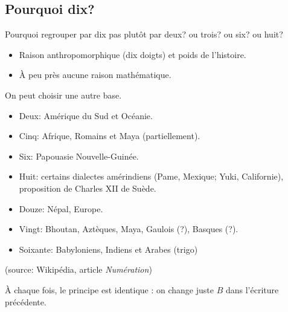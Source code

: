 \subsection{Pourquoi dix?}

Pourquoi regrouper par dix pas plutôt par deux? ou trois? ou six? ou
huit?

\begin{itemize}
\item Raison anthropomorphique (dix doigts) et poids de l'histoire.
\item À peu près aucune raison mathématique.
\end{itemize}

On peut choisir une autre base.

\begin{itemize}
\item Deux: Amérique du Sud et Océanie.
\item Cinq: Afrique, Romains et Maya (partiellement).
\item Six: Papouasie Nouvelle-Guinée.
\item Huit: certains dialectes amérindiens (Pame, Mexique; Yuki,
  Californie), proposition de Charles XII de Suède.
\item Douze: Népal, Europe.
\item Vingt: Bhoutan, Aztèques, Maya, Gaulois (?), Basques (?).
\item Soixante: Babyloniens, Indiens et Arabes (trigo)
\end{itemize}
(source: Wikipédia, article \textit{Numération})

\`A chaque fois, le principe est identique : on change juste $B$ dans l'écriture précédente.

